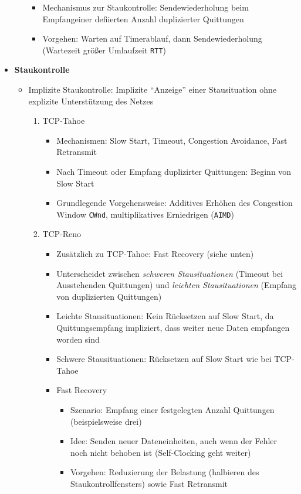 \begin{itemize}
\begin{itemize}
\begin{itemize}
			\item Mechanismus zur Staukontrolle: Sendewiederholung beim Empfangeiner defiierten Anzahl duplizierter Quittungen
			\item Vorgehen: Warten auf Timerablauf, dann Sendewiederholung (Wartezeit größer Umlaufzeit \texttt{RTT})
		\end{itemize}
	\end{itemize}
	\item \textbf{Staukontrolle}
	\begin{itemize}
		\item Implizite Staukontrolle: Implizite "`Anzeige"' einer Stausituation ohne explizite Unterstützung des Netzes
		\begin{enumerate}
			\item TCP-Tahoe
			\begin{itemize}
				\item Mechanismen: Slow Start, Timeout, Congestion Avoidance, Fast Retransmit
				\item Nach Timeout oder Empfang duplizirter Quittungen: Beginn von Slow Start
				\item Grundlegende Vorgehensweise: Additives Erhöhen des Congestion Window \texttt{CWnd}, multiplikatives Erniedrigen (\texttt{AIMD})
			\end{itemize}
			\item TCP-Reno
			\begin{itemize}
				\item Zusätzlich zu TCP-Tahoe: Fast Recovery (siehe unten)
				\item Unterscheidet zwischen \textit{schweren Stausituationen} (Timeout bei Ausstehenden Quittungen) und \textit{leichten Stausituationen} (Empfang von duplizierten Quittungen)
				\item Leichte Stausituationen: Kein Rücksetzen auf Slow Start, da Quittungsempfang impliziert, dass weiter neue Daten empfangen worden sind
				\item Schwere Stausituationen: Rücksetzen auf Slow Start wie bei TCP-Tahoe
				\item Fast Recovery
				\begin{itemize}
					\item Szenario: Empfang einer festgelegten Anzahl Quittungen (beispielsweise drei)
					\item Idee: Senden neuer Dateneinheiten, auch wenn der Fehler noch nicht behoben ist (Self-Clocking geht weiter)
					\item Vorgehen: Reduzierung der Belastung (halbieren des Staukontrollfensters) sowie Fast Retransmit

\end{itemize}
\end{itemize}
\end{enumerate}
\end{itemize}
\end{itemize}
